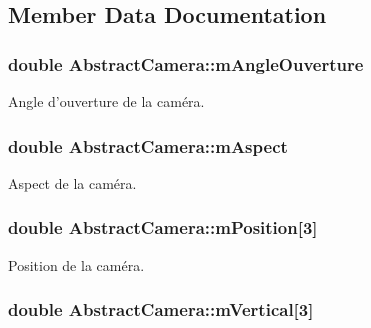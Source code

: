 \subsection{Member Data Documentation}
\hypertarget{class_abstract_camera_a5facdc9b6a67be951f8adea9d7ed8756}{
\subsubsection[{m\+Angle\+Ouverture}]{\setlength{\rightskip}{0pt plus 5cm}double Abstract\+Camera\+::m\+Angle\+Ouverture\hspace{0.3cm}{\ttfamily [protected]}}}\label{class_abstract_camera_a5facdc9b6a67be951f8adea9d7ed8756}


Angle d'ouverture de la caméra. 

\hypertarget{class_abstract_camera_a84ea352c679449eeef49d92274bfc9e0}{
\subsubsection[{m\+Aspect}]{\setlength{\rightskip}{0pt plus 5cm}double Abstract\+Camera\+::m\+Aspect\hspace{0.3cm}{\ttfamily [protected]}}}\label{class_abstract_camera_a84ea352c679449eeef49d92274bfc9e0}


Aspect de la caméra. 

\hypertarget{class_abstract_camera_aacd5e7f2d881e719f254a1d6e2904b91}{
\subsubsection[{m\+Position}]{\setlength{\rightskip}{0pt plus 5cm}double Abstract\+Camera\+::m\+Position\mbox{[}3\mbox{]}\hspace{0.3cm}{\ttfamily [protected]}}}\label{class_abstract_camera_aacd5e7f2d881e719f254a1d6e2904b91}


Position de la caméra. 

\hypertarget{class_abstract_camera_a64675d12169d6383a9371d7fd710a441}{
\subsubsection[{m\+Vertical}]{\setlength{\rightskip}{0pt plus 5cm}double Abstract\+Camera\+::m\+Vertical\mbox{[}3\mbox{]}\hspace{0.3cm}{\ttfamily [protected]}}}\label{class_abstract_camera_a64675d12169d6383a9371d7fd710a441}


